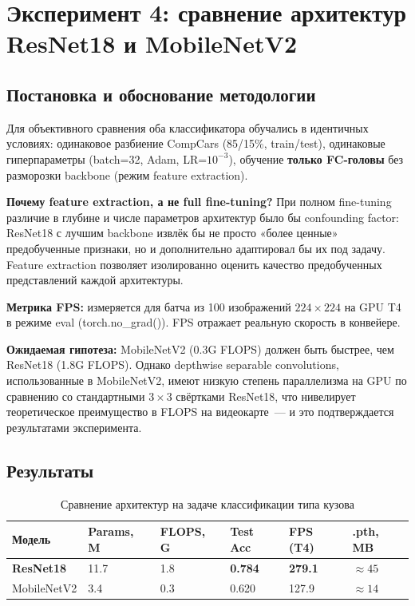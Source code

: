 \documentclass[14pt,a4paper]{report}
\numberwithin{equation}{chapter}
\numberwithin{figure}{chapter}
\numberwithin{table}{chapter}
\begin{document}
\section{Эксперимент 4: сравнение архитектур ResNet18 и MobileNetV2}

\subsection{Постановка и обоснование методологии}

Для объективного сравнения оба классификатора обучались
в идентичных условиях: одинаковое разбиение CompCars (85/15\%, train/test),
одинаковые гиперпараметры (batch=32, Adam, LR=$10^{-3}$),
обучение \textbf{только FC-головы} без разморозки backbone
(режим feature extraction).

\textbf{Почему feature extraction, а не full fine-tuning?}
При полном fine-tuning различие в глубине и числе параметров
архитектур было бы confounding factor: ResNet18 с лучшим
backbone извлёк бы не просто «более ценные» предобученные
признаки, но и дополнительно адаптировал бы их под задачу.
Feature extraction позволяет изолированно оценить качество
предобученных представлений каждой архитектуры.

\textbf{Метрика FPS:} измеряется для батча из 100 изображений
$224\times224$ на GPU T4 в режиме eval (torch.no\_grad()).
FPS отражает реальную скорость в конвейере.

\textbf{Ожидаемая гипотеза:} MobileNetV2 (0.3G FLOPS) должен
быть быстрее, чем ResNet18 (1.8G FLOPS). Однако depthwise
separable convolutions, использованные в MobileNetV2, имеют
низкую степень параллелизма на GPU по сравнению со стандартными
$3\times3$ свёртками ResNet18, что нивелирует теоретическое
преимущество в FLOPS на видеокарте~--- и это подтверждается
результатами эксперимента.

\subsection{Результаты}

\begin{table}[H]
\centering
\caption{Сравнение архитектур на задаче классификации типа кузова}
\label{tab:arch_comparison}
\small
\begin{tabularx}{\textwidth}{lXXXXX}
\toprule
\textbf{Модель} & \textbf{Params, M} & \textbf{FLOPS, G} & \textbf{Test Acc} & \textbf{FPS (T4)} & \textbf{.pth, MB} \\
\midrule
\textbf{ResNet18}    & 11.7 & 1.8 & \textbf{0.784} & \textbf{279.1} & $\approx 45$ \\
MobileNetV2 &  3.4 & 0.3 & 0.620 & 127.9 & $\approx 14$ \\
\bottomrule
\end{tabularx}
\end{table}
\end{document}
